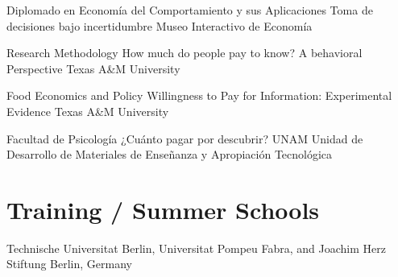 {Diplomado en Economía del Comportamiento y sus Aplicaciones}
{Toma de decisiones bajo incertidumbre}
{Museo Interactivo de Economía}
{}
{}

{Research Methodology}
{How much do people pay to know? A behavioral Perspective}
{Texas A\&M University}
{}
{}


{Food Economics and Policy}
{Willingness to Pay for Information: Experimental Evidence}
{Texas A\&M University}
{}
{}


{Facultad de Psicología}
{¿Cuánto pagar por descubrir?}
{UNAM}
{}
{Unidad de Desarrollo de Materiales de Enseñanza y Apropiación Tecnológica}


\section{Training / Summer Schools}

{Technische Universitat Berlin, Universitat Pompeu Fabra, and Joachim Herz Stiftung}
{}
{Berlin, Germany}
{}
{}
